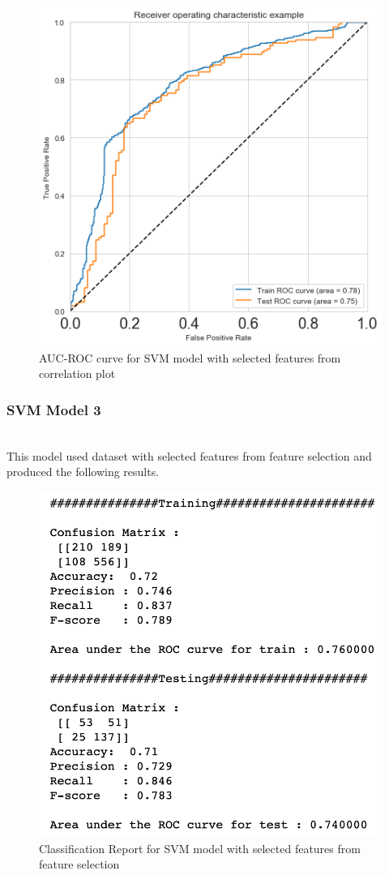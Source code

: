 \documentclass[format=sigconf]{acmart}
\begin{document}
\begin{figure}[H]
    \centering
    \includegraphics[scale=0.50]{images/AUC_ROC_SVM_Model_2.png}
    \caption{AUC-ROC curve for SVM model with selected features from correlation plot}
    \label{fig:aucrocmodel2}
\end{figure}

\subsubsection{SVM Model 3}
\hfill\\
This model used dataset with selected features from feature selection and produced the following results.

\begin{figure}[H]
    \centering
    \includegraphics[scale=0.50]{images/SVM_Model_3_results.png}
    \caption{Classification Report for SVM model with selected features from feature selection}
    \label{fig:svmmodel3}
\end{figure}
\end{document}
